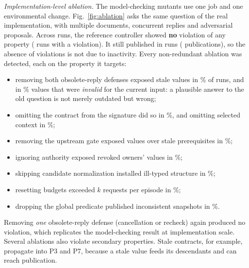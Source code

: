 \documentclass[10pt,journal,compsoc]{IEEEtran}
\theoremstyle{plain}
\theoremstyle{definition}
\begin{document}


\emph{Implementation-level ablation.} The model-checking mutants use one job and one environmental change. Fig.~\ref{fig:ablation} asks the same question of the real implementation, with multiple documents, concurrent replies and adversarial proposals. Across \AblRuns{} runs, the reference controller showed \textbf{no} violation of any property (\FullViolRuns{} runs with a violation). It still published in \FullPubRuns{} runs (\FullPublications{} publications), so the absence of violations is not due to inactivity. Every non-redundant ablation was detected, each on the property it targets:
\begin{itemize}
\item removing both obsolete-reply defenses exposed stale values in \ObsoleteStalePct\% of runs, and in \ObsoleteInvalidPct\% values that were \emph{invalid} for the current input: a plausible answer to the old question is not merely outdated but wrong;
\item omitting the contract from the signature did so in \ContractStalePct\%, and omitting selected context in \ContextStalePct\%;
\item removing the upstream gate exposed values over stale prerequisites in \UpstreamPct\%;
\item ignoring authority exposed revoked owners' values in \AuthorityPct\%;
\item skipping candidate normalization installed ill-typed structure in \CandidatePct\%;
\item resetting budgets exceeded $k$ requests per episode in \BudgetPct\%;
\item dropping the global predicate published inconsistent snapshots in \GlobalPublishPct\%.
\end{itemize}
Removing \emph{one} obsolete-reply defense (cancellation or recheck) again produced no violation, which replicates the model-checking result at implementation scale. Several ablations also violate secondary properties. Stale contracts, for example, propagate into P3 and P7, because a stale value feeds its descendants and can reach publication.


\end{document}
